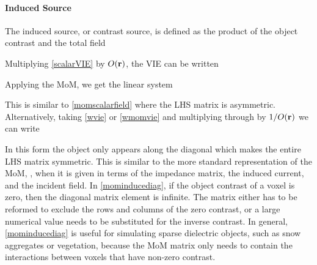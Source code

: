 \paragraph{Induced Source}

The induced source, or contrast source, is defined as the product of the object contrast and the total field

Multiplying \eqref{scalarVIE} by $O(\mathbf{r})$, the VIE can be written

Applying the MoM, we get the linear system

This is similar to \eqref{momscalarfield} where the LHS matrix is asymmetric.  Alternatively, taking \eqref{wvie} or \eqref{wmomvie} and multiplying through by $1/O(\mathbf{r})$ we can write

In this form the object only appears along the diagonal which makes the entire LHS matrix symmetric. This is similar to the more standard representation of the MoM, \cite{peterson1998computational}, when it is given in terms of the impedance matrix, the induced current, and the incident field. In \eqref{mominducediag}, if the object contrast of a voxel is zero, then the diagonal matrix element is infinite. The matrix either has to be reformed to exclude the rows and columns of the zero contrast, or a large numerical value needs to be substituted for the inverse contrast. In general, \eqref{mominducediag} is useful for simulating sparse dielectric objects, such as snow aggregates or vegetation, because the MoM matrix only needs to contain the interactions between voxels that have non-zero contrast. 

